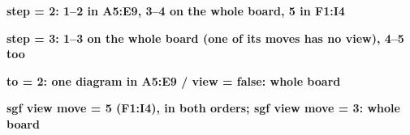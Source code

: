 \documentclass{article}
\newcommand\case[1]{\par\medskip\noindent\textbf{#1}\par\nopagebreak}
\begin{document}

\case{step = 2: 1--2 in A5:E9, 3--4 on the whole board, 5 in F1:I4}

\case{step = 3: 1--3 on the whole board (one of its moves has no view), 4--5 too}

\case{to = 2: one diagram in A5:E9 / view = false: whole board}

\case{sgf view move = 5 (F1:I4), in both orders; sgf view move = 3: whole board}
\begin{goban}[sgf view = views.sgf, sgf view move = 5]
\end{goban}
\begin{goban}[sgf view move = 5, sgf view = views.sgf]
\end{goban}
\begin{goban}[sgf view = views.sgf, sgf view move = 3]
\end{goban}
\end{document}
